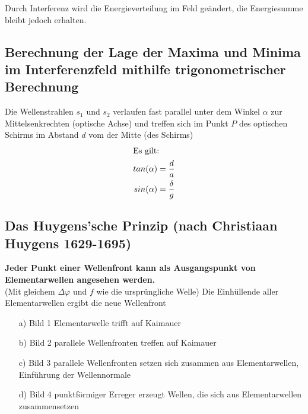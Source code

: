 \documentclass[12 pt]{article}
\numberwithin{equation}{section}
\begin{document}
Durch Interferenz wird die Energieverteilung im Feld geändert, die Energiesumme bleibt jedoch erhalten.

\subsection{Berechnung der Lage der Maxima und Minima im Interferenzfeld mithilfe trigonometrischer Berechnung} 
Die Wellenstrahlen $s_1$ und $s_2$ verlaufen fast parallel unter dem Winkel $\alpha$ zur Mittelsenkrechten (optische Achse) und treffen sich im Punkt $P$ des optischen Schirms im Abstand $d$ vom der Mitte (des Schirms)
\begin{align*}
	\intertext{Es gilt:}
	tan(\alpha)&=\dfrac{d}{a}\\
	sin(\alpha)&=\dfrac{\delta}{g}
\end{align*}
\subsection{Das Huygens'sche Prinzip (nach Christiaan Huygens 1629-1695)}
\textbf{Jeder Punkt einer Wellenfront kann als Ausgangspunkt von Elementarwellen angesehen werden.}\\(Mit gleichem $\Delta \varphi$ und $f$ wie die ursprüngliche Welle)
Die Einhüllende aller Elementarwellen ergibt die neue Wellenfront

\begin{enumerate}
	\item[a)] Bild 1 Elementarwelle trifft auf Kaimauer
	\item[b)] Bild 2 parallele Wellenfronten treffen auf Kaimauer
	\item[c)] Bild 3 parallele Wellenfronten setzen sich zusammen aus Elementarwellen, Einführung der Wellennormale
	\item[d)] Bild 4 punktförmiger Erreger erzeugt Wellen, die sich aus Elementarwellen zusammensetzen
\end{enumerate}
\end{document}
